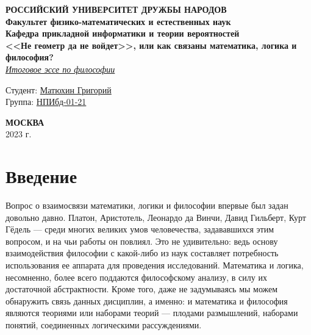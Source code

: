 \documentclass[a4page]{article}
\begin{document}
\begin{titlepage}
	\begin{center}
		\hfill \break
		\textbf{
			\large{РОССИЙСКИЙ УНИВЕРСИТЕТ ДРУЖБЫ НАРОДОВ}\\
			\normalsize{Факультет физико-математических и естественных наук}\\
			\normalsize{Кафедра прикладной информатики и теории вероятностей}\\
		}
		\vspace*{\fill}
		\Large{\textbf{<<Не геометр да не войдет>>, или как связаны математика, логика и философия?}}
		\\
		\underline{\textit{\normalsize{Итоговое эссе по философии}}}
		\vspace*{\fill}

	\end{center}

	\begin{flushright}
		Студент: \underline{Матюхин Григорий}\\ \vspace{0.5cm}
		Группа: \underline{НПИбд-01-21}
	\end{flushright}

	\begin{center} \textbf{МОСКВА} \\ 2023 г. \end{center}
	\thispagestyle{empty}

\end{titlepage}

\newpage

\tableofcontents

\newpage

\section{Введение}
Вопрос о взаимосвязи математики, логики и философии впервые был задан довольно давно.
Платон, Аристотель, Леонардо да Винчи, Давид Гильберт, Курт Гёдель ---
среди многих великих умов человечества, задававшихся этим вопросом,
и на чьи работы он повлиял.
Это не удивительно: ведь основу взаимодействия философии с какой-либо из наук
составляет потребность использования ее аппарата для проведения исследований.
Математика и логика, несомненно, более всего поддаются философскому анализу,
в силу их достаточной абстрактности.
Кроме того, даже не задумываясь мы можем обнаружить связь данных дисциплин,
а именно: и математика и философия являются теориями или наборами теорий ---
плодами размышлений, наборами понятий, соединенных логическими рассуждениями.
\end{document}
